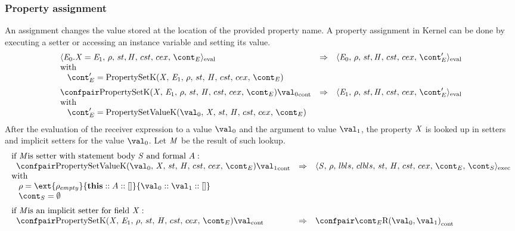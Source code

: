 \documentclass{article}
\begin{document}
\subsubsection{Property assignment}
\label{subsubsec:property-assignment}
An assignment changes the value stored at the location of the provided property name.
A property assignment in Kernel can be done by executing a setter or accessing an instance variable and setting its value.
%
\newcommand{\PropertySetK}{\mathrm{PropertySetK}(\idmeta,\,\expressionmeta_1,\,\env,\,\strace,\,\handler,\,\cstrace,\,\cex,\,\econt)}
\newcommand{\PropertySetVK}{\mathrm{PropertySetValueK}(\val_0,\,\idmeta,\,\strace,\,\handler,\,\cstrace,\,\cex,\,\econt)}
\[
  \begin{array}{lcl}
	\cesktrans{
		\evalconf{\PropertySet{\expressionmeta_0}{\idmeta}{\expressionmeta_1}}{\env}{\strace}{\cstrace}{\cex}{\econt}}{
		\evalconf{\expressionmeta_0}{\env}{\strace}{\cstrace}{\cex}{\econt'}}\\
	\textrm{with}\\
	\hspace{3mm}
	\econt' = \PropertySetK\\[2mm]

	\cesktrans{
		\contconf{\PropertySetK}{\val_0}}{
		\evalconf{\expressionmeta_1}{\env}{\strace}{\cstrace}{\cex}{\econt'}}\\
	\textrm{with}\\
	\hspace{3mm}
	\econt' = \PropertySetVK
  \end{array}
\]
\noindent
After the evaluation of the receiver expression to a value $\val_0$ and the argument to value $\val_1$, the property $\mathit{X}$ is looked up in setters and implicit setters for the value $\val_0$. Let $\mathit{M}$ be the result of such lookup.
\[
  \begin{array}{lcl}
	\textrm{if \membermeta is setter with statement body }\stmt \textrm{ and formal }\formal :\\
	\hspace{2mm}
	\cesktrans{
		\contconf{\PropertySetVK}{\val_1}}{
		\execconf{\stmt}{\env}{\lbls}{\clbls}{\handler}{\cstrace}{\cex}{\econt}{\scont}}\\
	\textrm{with}\\
	\hspace{3mm}
	\env = \ext{\env_{empty}}{\mathbf{this} :: \formal :: []}{\val_0 :: \val_1 :: []}\\
	\hspace{3mm}
	\scont = \emptyset\\[2mm]

	\textrm{if \membermeta is an implicit setter for field }\idmeta :\\
	\hspace{2mm}
	\cesktrans{
		\contconf{\PropertySetK}{\val}}{
		\contconf{\econt}{\textrm{R}(\val_0, \val_1)}}
  \end{array}
\]
\end{document}
